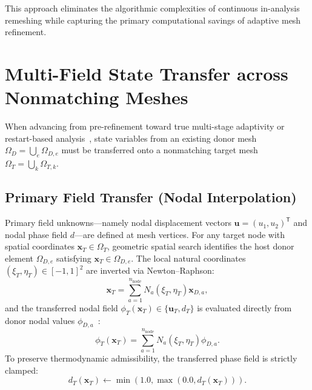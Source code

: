 This approach eliminates the algorithmic complexities of continuous in-analysis remeshing while capturing the primary computational savings of adaptive mesh refinement.

\section{Multi-Field State Transfer across Nonmatching Meshes}
\label{sec:theory_state_transfer}

When advancing from pre-refinement toward true multi-stage adaptivity or restart-based analysis~\cite{rashid2002}, state variables from an existing donor mesh $\Omega_D = \bigcup_{e} \Omega_{D,e}$ must be transferred onto a nonmatching target mesh $\Omega_T = \bigcup_{k} \Omega_{T,k}$.

\subsection{Primary Field Transfer (Nodal Interpolation)}
Primary field unknowns---namely nodal displacement vectors $\mathbf{u} = (u_1, u_2)^{\mathsf{T}}$ and nodal phase field $d$---are defined at mesh vertices. For any target node with spatial coordinates $\mathbf{x}_T \in \Omega_T$, geometric spatial search identifies the host donor element $\Omega_{D,e}$ satisfying $\mathbf{x}_T \in \Omega_{D,e}$. The local natural coordinates $(\xi_T, \eta_T) \in [-1, 1]^2$ are inverted via Newton--Raphson:
\begin{equation}
\mathbf{x}_T = \sum_{a=1}^{n_{\mathrm{node}}} N_a(\xi_T, \eta_T) \mathbf{x}_{D,a},
\end{equation}
and the transferred nodal field $\phi_T(\mathbf{x}_T) \in \{\mathbf{u}_T, d_T\}$ is evaluated directly from donor nodal values $\phi_{D,a}$~\cite{farhat1998,cebral1997}:
\begin{equation}
\label{eq:nodal_interpolation_transfer}
\phi_T(\mathbf{x}_T) = \sum_{a=1}^{n_{\mathrm{node}}} N_a(\xi_T, \eta_T) \phi_{D,a}.
\end{equation}
To preserve thermodynamic admissibility, the transferred phase field is strictly clamped:
\begin{equation}
\label{eq:phase_clamp}
d_T(\mathbf{x}_T) \leftarrow \min\left( 1.0, \max(0.0, d_T(\mathbf{x}_T)) \right).
\end{equation}

